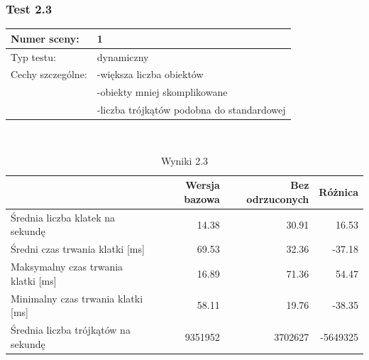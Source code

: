 \documentclass[a4paper,twoside,12pt]{book}
\begin{document}
\vbox{}

\subsubsection{Test 2.3}
\begin{tabular}{|l||l|}
\hline
Numer sceny: & 1 \\
\hline
Typ testu: & dynamiczny \\
\hline
Cechy szczególne: & -większa liczba obiektów \\
& -obiekty mniej skomplikowane \\
& -liczba trójkątów podobna do standardowej \\
\hline
\end{tabular}\\

\vbox{}

\begin{table}[H]
    \centering
    \caption{Wyniki 2.3}
    \label{tab:frustrum_test3}
    \begin{tabular}{|l||r|r|r|}
        \hline
        & Wersja bazowa & Bez odrzuconych & Różnica \\
        \hline
        Średnia liczba klatek na sekundę & 14.38 & 30.91 & 16.53 \\
        \hline
        Średni czas trwania klatki [ms] & 69.53 & 32.36 & -37.18 \\
        \hline
        Maksymalny czas trwania klatki [ms] & 16.89 & 71.36 & 54.47 \\
        \hline
        Minimalny czas trwania klatki [ms] & 58.11 & 19.76 & -38.35 \\
        \hline
        Średnia liczba trójkątów na sekundę & 9351952 & 3702627 & -5649325 \\
        \hline
    \end{tabular}
\end{table}

\vbox{}
\end{document}
